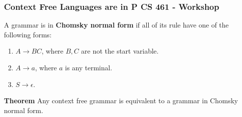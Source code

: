 \documentclass[11pt]{exam}
\begin{document}
\subsubsection*{Context Free Languages are in P \hfill CS 461 - Workshop}

\noindent
\begin{tcolorbox}
A grammar is in \textbf{Chomsky normal form} if all of its rule have one of the following forms:
\begin{enumerate}
\item $A \rightarrow BC$, where $B, C$ are not the start variable. 
\item $A \rightarrow a$, where $a$ is any terminal.
\item $S \rightarrow \epsilon$. 
\end{enumerate}
\textbf{Theorem} Any context free grammar is equivalent to a grammar in Chomsky normal form. 
\end{tcolorbox}
\end{document}
